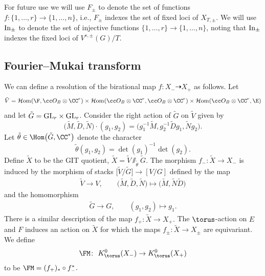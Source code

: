 For future use we will use $F_\pm$ to denote the set of functions $f\colon \{1, \dots, r\} \to \{1, \dots, n\}$, i.e., $F_\pm$ indexes the set of fixed loci of $X_{T, \pm}$. We will use ${\rm In}_\pm$ to denote the set of injective functions $\{1, \dots, r\} \to \{1, \dots, n\}$, noting that ${\rm In}_\pm$ indexes the fixed loci of $V^{s, \pm}(G)/T.$



\subsection{Fourier--Mukai transform}\label{s:FM}
We can define a resolution of the birational map
$f\colon X_{-} \dashrightarrow X_{+}$
as follows. Let
\[
\tilde V = \mathcal{H}{\rm om}(\F, \cc O_B \otimes \CC^r) \times \mathcal{H}{\rm om}(\cc O_B \otimes \CC^r, \cc O_B \otimes \CC^r) \times \mathcal{H}{\rm om}(\cc O_B \otimes \CC^r, \E)
\]
and let $\tilde G = {\rm GL}_r \times {\rm GL}_r$. Consider the right action of $\tilde G$ on $\tilde V$ given by
\[
\bigl(\tilde M, \tilde D, \tilde N\bigr) \cdot (g_1, g_2)= \bigl( g_1^{-1}\tilde M , g_2^{-1}\tilde D g_1, \tilde Ng_2\bigr).
\]
Let $\tilde \theta \in \Hom\bigl(\tilde G, \CC^*\bigr)$ denote the character
\[
\tilde \theta(g_1, g_2) = \det(g_1)^{-1} \det(g_2).
\]
Define $\tilde X$ to be the GIT quotient,
$\tilde X = \tilde V \sslash_{\tilde \theta} \tilde G$.
The morphism $f_{-}\colon \tilde X \to X_{-}$ is induced by the morphism of stacks
$\bigl[\tilde V/\tilde G\bigr] \to [V/G]$
defined by the map
\begin{align*}
 \tilde V \to V, \qquad
 \bigl(\tilde M, \tilde D, \tilde N\bigr) \mapsto \bigl(\tilde M, \tilde N \tilde D\bigr)
\end{align*}
and the homomorphism
\begin{align*}
 \tilde G \to G ,\qquad
 (g_1, g_2) \mapsto g_1.
\end{align*}
There is a similar description of the map $f_{+}\colon \tilde X \to X_{+}.$
The $\torus$-action on $E$ and $F$ induces an action on $\tilde X$ for which the maps $f_\pm\colon \tilde X \to X_\pm$ are equivariant. We define
\begin{equation}\label{Kmap}
\FM\colon \ K^0_\torus(X_{-}) \to K^0_\torus(X_{+})
\end{equation}
to be $\FM = (f_{+})_* \circ f_{-}^*.$


